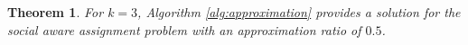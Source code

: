 \documentclass[letterpaper]{article} %
\newtheorem{theorem}{Theorem}
\begin{document}


\begin{theorem}
For $k=3$, Algorithm \ref{alg:approximation} provides a solution for the social aware assignment problem with an approximation ratio of $0.5$.
\end{theorem}



\end{document}
